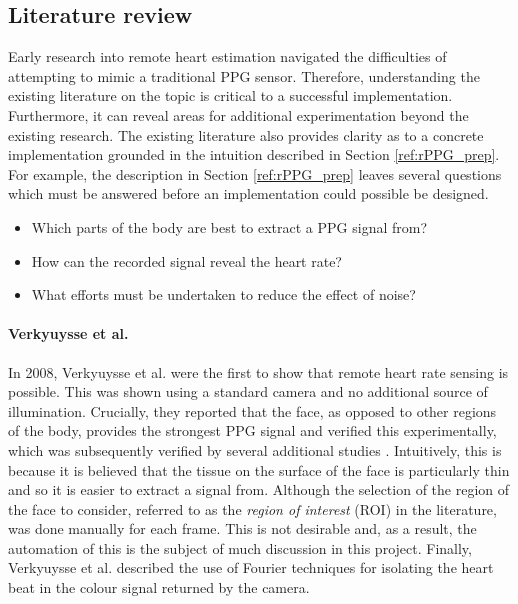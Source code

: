 \subsection{Literature review}
\label{ref:literature_review}
Early research into remote heart estimation navigated the difficulties of attempting to mimic a traditional PPG sensor.
Therefore, understanding the existing literature on the topic is critical to a successful implementation. Furthermore, it can reveal areas for additional experimentation beyond the existing 
research.
The existing literature also provides clarity as to a concrete implementation grounded in the intuition described in Section \ref{ref:rPPG_prep}.
For example, the description in Section \ref{ref:rPPG_prep} leaves several questions which must be answered before an implementation could possible be designed.
\begin{itemize}
    \item Which parts of the body are best to extract a PPG signal from?
    \item How can the recorded signal reveal the heart rate?
    \item What efforts must be undertaken to reduce the effect of noise?
\end{itemize}
\paragraph{Verkyuysse et al.}
In 2008, Verkyuysse et al. \cite{Verkruysse2008} were the first to show that remote heart rate sensing is possible. This was shown using a standard camera and no additional source of 
illumination. Crucially, they reported that the face, as opposed to other regions of the body, provides the strongest PPG signal and verified this experimentally, which was subsequently
verified by several additional studies \cite{vanderKooij2019}. Intuitively, this is because
it is believed that the tissue on the surface of the face is particularly thin and so it is easier to extract a signal from. 
Although the selection of the region of the face to consider, referred to as the \textit{region of interest} (ROI) in the literature, was done manually for each frame. This is not desirable and, 
as a result, the automation of this is the subject of much discussion in this project. Finally, Verkyuysse et al. \cite{Verkruysse2008} described the use of Fourier techniques for isolating the 
heart beat in the colour signal returned by the camera.

